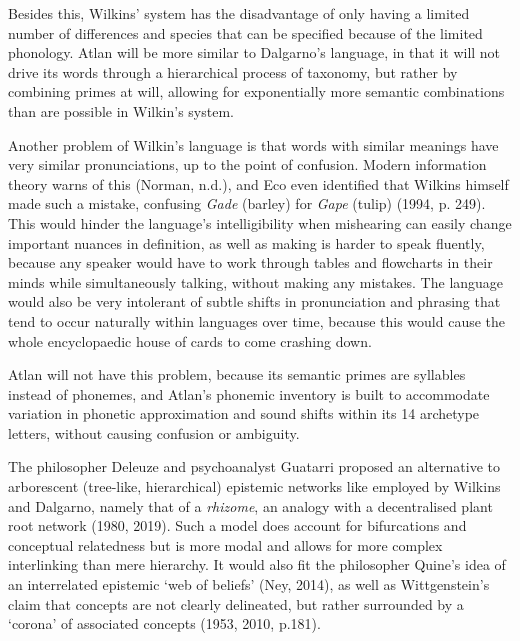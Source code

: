 Besides this, Wilkins’ system has the disadvantage of only having a limited number of differences and species that can be specified because of the limited phonology. Atlan will be more similar to Dalgarno’s language, in that it will not drive its words through a hierarchical process of taxonomy, but rather by combining primes at will, allowing for exponentially more semantic combinations than are possible in Wilkin’s system. 

Another problem of Wilkin’s language is that words with similar meanings have very similar pronunciations,  up to the point of confusion. Modern information theory warns of this (Norman, n.d.), and Eco even identified that Wilkins himself made such a mistake, confusing {\it Gade} (barley) for {\it Gape} (tulip) (1994, p. 249). This would hinder the language’s intelligibility when mishearing can easily change important nuances in definition, as well as making is harder to speak fluently, because any speaker would have to work through tables and flowcharts in their minds while simultaneously talking, without making any mistakes. The language would also be very intolerant of subtle shifts in pronunciation and phrasing that tend to occur naturally within languages over time, because this would cause the whole encyclopaedic house of cards to come crashing down. 

Atlan will not have this problem, because its semantic primes are syllables instead of phonemes, and Atlan’s phonemic inventory is built to accommodate variation in phonetic approximation and sound shifts within its 14 archetype letters, without causing confusion or ambiguity. 

The philosopher Deleuze and psychoanalyst Guatarri proposed an alternative to arborescent (tree-like, hierarchical) epistemic networks like employed by Wilkins and Dalgarno, namely that of a {\it rhizome}, an analogy with a decentralised plant root network (1980, 2019). Such a model does account for bifurcations and conceptual relatedness but is more modal and allows for more complex interlinking than mere hierarchy. It would also fit the philosopher Quine’s idea of an interrelated epistemic ‘web of beliefs’ (Ney, 2014), as well as Wittgenstein’s claim that concepts are not clearly delineated, but rather surrounded by a ‘corona’ of associated concepts (1953, 2010, p.181). 

